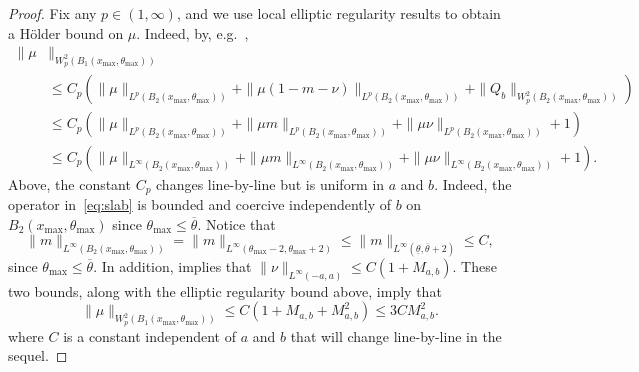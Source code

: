 \documentclass[11pt]{article}    %
\begin{document}
\begin{proof}
Fix any $p \in (1,\infty)$, and we use local elliptic regularity results to obtain a H\"older bound on $\mu$.  Indeed, by, e.g.~\cite[Theorem~9.13]{GilbargTrudinger},%
\begin{align*}
	\|\mu&\|_{W^{2}_p\left( B_1(x_{\max},\theta_{\max}) \right)}\\
		&\leq C_p\left( \|\mu\|_{L^p\left( B_2(x_{\max},\theta_{\max}) \right)} + \|\mu(1 - m -\nu)\|_{L^p\left( B_2(x_{\max},\theta_{\max}) \right)} + \|Q_b\|_{W^2_p\left( B_2(x_{\max},\theta_{\max}) \right)}\right)\\
		&\leq C_p\left(\|\mu\|_{L^p\left( B_2(x_{\max},\theta_{\max}) \right)} + \|\mu m\|_{L^p\left( B_2(x_{\max},\theta_{\max}) \right)} + \|\mu \nu\|_{L^p\left( B_2(x_{\max},\theta_{\max}) \right)} + 1\right)\\
		&\leq C_p\left( \|\mu\|_{L^\infty\left( B_2(x_{\max},\theta_{\max}) \right)} + \|\mu m\|_{L^\infty\left( B_2(x_{\max},\theta_{\max}) \right)} + \|\mu \nu\|_{L^\infty\left( B_2(x_{\max},\theta_{\max}) \right)} + 1\right).
\end{align*}
Above, the constant $C_p$ changes line-by-line but is uniform in $a$ and $b$.  Indeed, the operator in~\eqref{eq:slab} is bounded and coercive independently of $b$ on $B_2(x_{\max},\theta_{\max})$ since $\theta_{\max} \leq \overline \theta$.  Notice that
\[
	\|m\|_{L^\infty(B_2(x_{\max},\theta_{\max}))} = \|m\|_{L^\infty(\theta_{\max}-2,\theta_{\max}+2)} \leq \|m\|_{L^\infty(\underline \theta, \overline \theta + 2)} \leq C,
\]
since $\theta_{\max} \leq \overline \theta$.  In addition,  implies that $\|\nu\|_{L^\infty(-a,a)}\leq C(1 + M_{a,b})$.  These two bounds, along with the elliptic regularity bound above, imply that
\[
	\|\mu\|_{W^2_p(B_1(x_{\max}, \theta_{\max}))}
		\leq C(1 + M_{a,b} + M_{a,b}^2)
		\leq 3C M_{a,b}^2.
\]
where $C$ is a constant independent of $a$ and $b$ that will change line-by-line in the sequel.

\end{proof}
\end{document}
